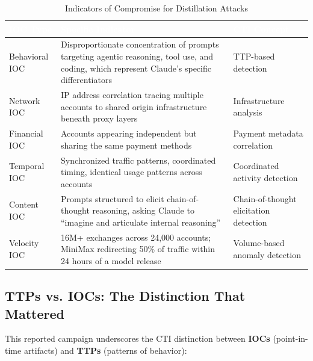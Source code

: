 \documentclass[11pt,a4paper]{article}
\begin{document}
\begin{table}[H]
\centering
\small
\renewcommand{\arraystretch}{1.2}
\begin{tabularx}{\textwidth}{|L{2.8cm}|X|L{3.2cm}|}
\hline
{}
\textcolor{white}{\textbf{IOC Type}} & \textcolor{white}{\textbf{Specific Indicator}} & \textcolor{white}{\textbf{CTI Concept}} \\
\hline
Behavioral IOC & Disproportionate concentration of prompts targeting agentic reasoning, tool use, and coding, which represent Claude's specific differentiators & TTP-based detection \\
Network IOC & IP address correlation tracing multiple accounts to shared origin infrastructure beneath proxy layers & Infrastructure analysis \\
Financial IOC & Accounts appearing independent but sharing the same payment methods & Payment metadata correlation \\
Temporal IOC & Synchronized traffic patterns, coordinated timing, identical usage patterns across accounts & Coordinated activity detection \\
Content IOC & Prompts structured to elicit chain-of-thought reasoning, asking Claude to ``imagine and articulate internal reasoning'' & Chain-of-thought elicitation detection \\
Velocity IOC & 16M+ exchanges across 24,000 accounts; MiniMax redirecting 50\% of traffic within 24 hours of a model release & Volume-based anomaly detection \\
\hline
\end{tabularx}
\caption{Indicators of Compromise for Distillation Attacks}
\label{tab:iocs}
\end{table}

\subsection{TTPs vs. IOCs: The Distinction That Mattered}

This reported campaign underscores the CTI distinction between \textbf{IOCs} (point-in-time artifacts) and \textbf{TTPs} (patterns of behavior):
\end{document}

